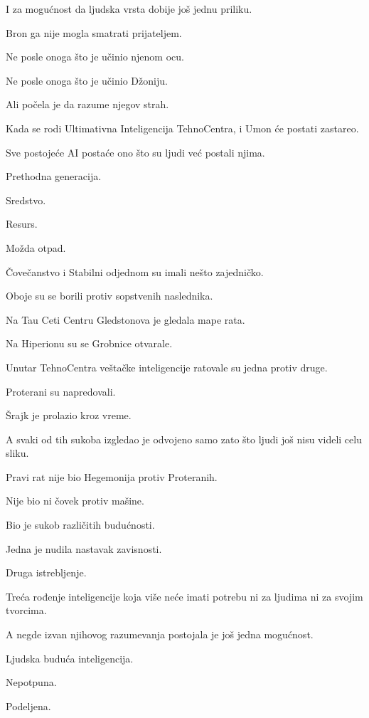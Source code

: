 I za mogućnost da ljudska vrsta dobije još jednu priliku.

\bigskip

Bron ga nije mogla smatrati prijateljem.

Ne posle onoga što je učinio njenom ocu.

Ne posle onoga što je učinio Džoniju.

Ali počela je da razume njegov strah.

Kada se rodi Ultimativna Inteligencija TehnoCentra, i Umon će postati zastareo.

Sve postojeće AI postaće ono što su ljudi već postali njima.

Prethodna generacija.

Sredstvo.

Resurs.

Možda otpad.

\bigskip

Čovečanstvo i Stabilni odjednom su imali nešto zajedničko.

Oboje su se borili protiv sopstvenih naslednika.

\bigskip

Na Tau Ceti Centru Gledstonova je gledala mape rata.

Na Hiperionu su se Grobnice otvarale.

Unutar TehnoCentra veštačke inteligencije ratovale su jedna protiv druge.

Proterani su napredovali.

Šrajk je prolazio kroz vreme.

A svaki od tih sukoba izgledao je odvojeno samo zato što ljudi još nisu videli celu sliku.

\bigskip

Pravi rat nije bio Hegemonija protiv Proteranih.

Nije bio ni čovek protiv mašine.

Bio je sukob različitih budućnosti.

Jedna je nudila nastavak zavisnosti.

Druga istrebljenje.

Treća rođenje inteligencije koja više neće imati potrebu ni za ljudima ni za svojim tvorcima.

A negde izvan njihovog razumevanja postojala je još jedna mogućnost.

Ljudska buduća inteligencija.

Nepotpuna.

Podeljena.

